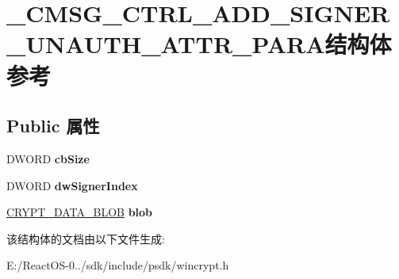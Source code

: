 \hypertarget{struct___c_m_s_g___c_t_r_l___a_d_d___s_i_g_n_e_r___u_n_a_u_t_h___a_t_t_r___p_a_r_a}{}\section{\+\_\+\+C\+M\+S\+G\+\_\+\+C\+T\+R\+L\+\_\+\+A\+D\+D\+\_\+\+S\+I\+G\+N\+E\+R\+\_\+\+U\+N\+A\+U\+T\+H\+\_\+\+A\+T\+T\+R\+\_\+\+P\+A\+R\+A结构体 参考}
\label{struct___c_m_s_g___c_t_r_l___a_d_d___s_i_g_n_e_r___u_n_a_u_t_h___a_t_t_r___p_a_r_a}
\subsection*{Public 属性}
\begin{DoxyCompactItemize}
\item 
\mbox{\label{struct___c_m_s_g___c_t_r_l___a_d_d___s_i_g_n_e_r___u_n_a_u_t_h___a_t_t_r___p_a_r_a_af576c6a290307c8f8b11cf5b2b3eb82e}} 
D\+W\+O\+RD {\bfseries cb\+Size}
\item 
\mbox{\label{struct___c_m_s_g___c_t_r_l___a_d_d___s_i_g_n_e_r___u_n_a_u_t_h___a_t_t_r___p_a_r_a_a67a461042d82e80420021bc460c67286}} 
D\+W\+O\+RD {\bfseries dw\+Signer\+Index}
\item 
\mbox{\label{struct___c_m_s_g___c_t_r_l___a_d_d___s_i_g_n_e_r___u_n_a_u_t_h___a_t_t_r___p_a_r_a_aaf3169e2ea930d736275e5761fa4cab9}} 
\hyperlink{struct___c_r_y_p_t_o_a_p_i___b_l_o_b}{C\+R\+Y\+P\+T\+\_\+\+D\+A\+T\+A\+\_\+\+B\+L\+OB} {\bfseries blob}
\end{DoxyCompactItemize}


该结构体的文档由以下文件生成\+:\begin{DoxyCompactItemize}
\item 
E\+:/\+React\+O\+S-\/0../sdk/include/psdk/wincrypt.\+h\end{DoxyCompactItemize}
